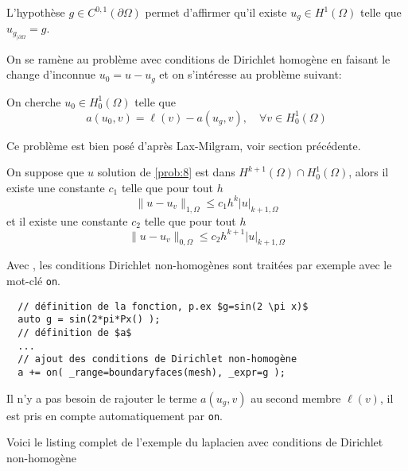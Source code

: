 \begin{remark}
  \label{rem:27}
  L'hypothèse $g \in C^{0,1}(\partial \Omega)$ permet d'affirmer qu'il existe
  $u_g \in H^1(\Omega)$ telle que $u_{g_{|\partial \Omega}} = g$.
\end{remark}

On se ramène au problème avec conditions de Dirichlet homogène en faisant le
change d'inconnue $u_0=u-u_g$ et on s'intéresse au problème suivant:
\begin{problem}
  \label{prob:8}
  On cherche $u_0 \in H^1_0(\Omega)$ telle que
  \begin{equation}
    \label{eq:77}
    a(u_0,v) = \ell(v) - a(u_g,v),\quad \forall v \in H^1_0(\Omega)
  \end{equation}
\end{problem}
Ce problème est bien posé d'après Lax-Milgram, voir section précédente.

\begin{theorem}
  \label{thr:18}
  On suppose que $u$ solution de \ref{prob:8} est dans $H^{k+1}(\Omega) \cap
  H^1_0(\Omega)$, alors il existe une constante $c_1$ telle que pour tout $h$
  \begin{equation}
    \label{eq:73}
    \|u-u_v\|_{1,\Omega} \le c_1 h^k |u|_{k+1,\Omega}
  \end{equation}
  et il existe une constante $c_2$ telle que pour tout $h$
  \begin{equation}
    \label{eq:74}
    \|u-u_v\|_{0,\Omega} \le c_2 h^{k+1} |u|_{k+1,\Omega}
  \end{equation}
\end{theorem}

Avec \Feel, les conditions Dirichlet non-homogènes sont traitées par exemple
avec le mot-clé \texttt{on}.
\begin{lstlisting}
  // définition de la fonction, p.ex $g=sin(2 \pi x)$
  auto g = sin(2*pi*Px() );
  // définition de $a$
  ...
  // ajout des conditions de Dirichlet non-homogène
  a += on( _range=boundaryfaces(mesh), _expr=g );
\end{lstlisting}
\begin{remark}
  \label{rem:28}
  Il n'y a pas besoin de rajouter le terme $a(u_g,v)$ au second membre $\ell(v)$, il est
  pris en compte automatiquement par \texttt{on}.
\end{remark}
Voici le listing complet de l'exemple du laplacien avec conditions de Dirichlet non-homogène


